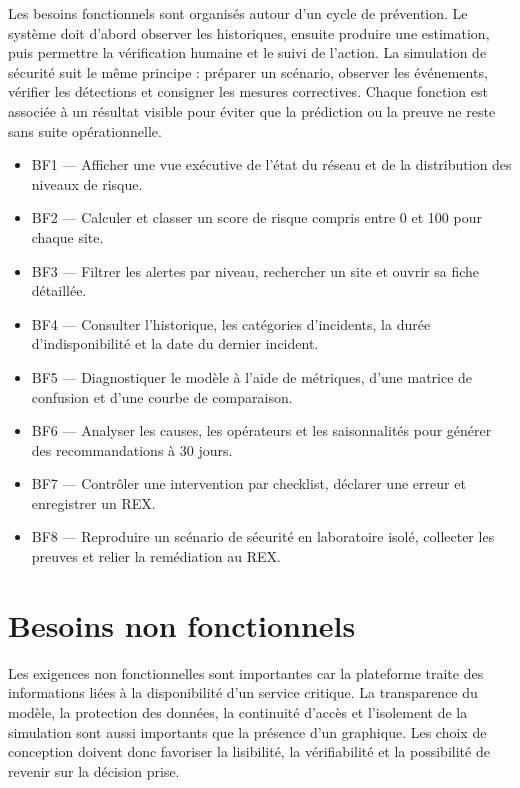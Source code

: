\documentclass[12pt,a4paper,oneside]{report}
\begin{document}
Les besoins fonctionnels sont organisés autour d’un cycle de prévention. Le système doit d’abord observer les historiques, ensuite produire une estimation, puis permettre la vérification humaine et le suivi de l’action. La simulation de sécurité suit le même principe : préparer un scénario, observer les événements, vérifier les détections et consigner les mesures correctives. Chaque fonction est associée à un résultat visible pour éviter que la prédiction ou la preuve ne reste sans suite opérationnelle.

\begin{itemize}
  \item BF1 — Afficher une vue exécutive de l’état du réseau et de la distribution des niveaux de risque.
  \item BF2 — Calculer et classer un score de risque compris entre 0 et 100 pour chaque site.
  \item BF3 — Filtrer les alertes par niveau, rechercher un site et ouvrir sa fiche détaillée.
  \item BF4 — Consulter l’historique, les catégories d’incidents, la durée d’indisponibilité et la date du dernier incident.
  \item BF5 — Diagnostiquer le modèle à l’aide de métriques, d’une matrice de confusion et d’une courbe de comparaison.
  \item BF6 — Analyser les causes, les opérateurs et les saisonnalités pour générer des recommandations à 30 jours.
  \item BF7 — Contrôler une intervention par checklist, déclarer une erreur et enregistrer un REX.
  \item BF8 — Reproduire un scénario de sécurité en laboratoire isolé, collecter les preuves et relier la remédiation au REX.
\end{itemize}

\section{Besoins non fonctionnels}

Les exigences non fonctionnelles sont importantes car la plateforme traite des informations liées à la disponibilité d’un service critique. La transparence du modèle, la protection des données, la continuité d’accès et l’isolement de la simulation sont aussi importants que la présence d’un graphique. Les choix de conception doivent donc favoriser la lisibilité, la vérifiabilité et la possibilité de revenir sur la décision prise.
\end{document}
